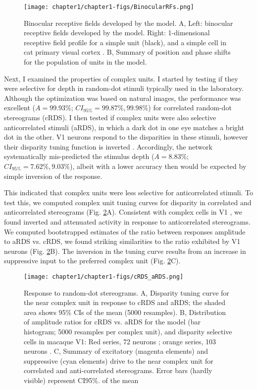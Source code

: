 \begin{figure}[!h]
  \centering
  \texttt{[image: chapter1/chapter1-figs/BinocularRFs.png]}
  \caption[Binocular receptive fields developed by the model.]{Binocular receptive fields developed by the model. A, Left: binocular receptive fields developed by the model. Right: 1-dimensional receptive field profile for a simple unit (black), and a simple cell in cat primary visual cortex \cite{DeAngelis:1991mb}. B, Summary of position and phase shifts for the population of units in the model.}
  \label{fig:BinocularRFs}
\end{figure}

Next, I examined the properties of complex units. I started by testing if they were selective for depth in random-dot stimuli typically used in the laboratory. Although the optimization was based on natural images, the performance was excellent ($A=99.93 \%$; $CI_{95\%} =99.87\%, 99.98\%$) for correlated random-dot stereograms (cRDS). I then tested if complex units were also selective anticorrelated stimuli (aRDS), in which a dark dot in one eye matches a bright dot in the other. V1 neurons respond to the disparities in these stimuli, however their disparity tuning function is inverted \cite{Cumming:1997ve}. Accordingly, the network systematically mis-predicted the stimulus depth ($A=8.83\%$; $CI_{95\%}=7.62\%, 9.03\%$), albeit with a lower accuracy then would be expected by simple inversion of the response. 

This indicated that complex units were less selective for anticorrelated stimuli. To test this, we computed complex unit tuning curves for disparity in correlated and anticorrelated stereograms (Fig. \ref{fig:cRDSaRDS}A). Consistent with complex cells in V1 \cite{Cumming:1997ve,Samonds:2013cs}, we found inverted and attenuated activity in response to anticorrelated stereograms. We computed bootstrapped estimates of the ratio between responses amplitude to aRDS vs. cRDS, we found striking similarities to the ratio exhibited by V1 neurons \cite{Cumming:1997ve,Samonds:2013cs} (Fig. \ref{fig:cRDSaRDS}B). The inversion in the tuning curve results from an increase in suppressive input to the preferred complex unit (Fig. \ref{fig:cRDSaRDS}C).

\begin{figure}[!h]
  \centering
  \texttt{[image: chapter1/chapter1-figs/cRDS\_aRDS.png]}
  \caption[Response to random-dot stereograms.]{Response to random-dot stereograms. A, Disparity tuning curve for the near complex unit in response to cRDS and aRDS; the shaded area shows 95\% CIs of the mean (5000 resamples). B, Distribution of amplitude ratios for cRDS vs. aRDS for the model (bar histogram; 5000 resamples per complex unit), and disparity selective cells in macaque V1: Red series, 72 neurons \cite{Cumming:1997ve}; orange series, 103 neurons \cite{Samonds2013}. C, Summary of excitatory (magenta elements) and suppressive (cyan elements) drive to the near complex unit for correlated and anti-correlated stereograms. Error bars (hardly visible) represent CI95\%. of the mean}
  \label{fig:cRDSaRDS}
\end{figure}

